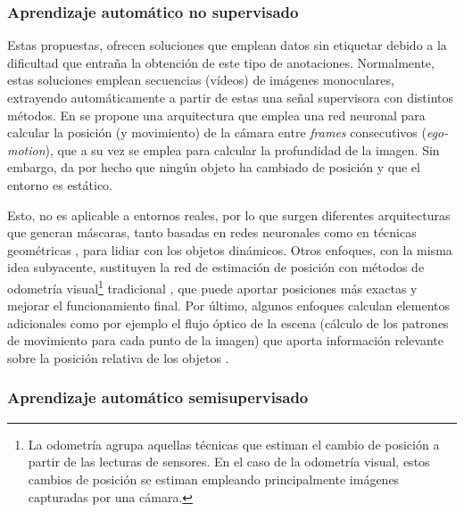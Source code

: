 
\subsubsection{Aprendizaje automático no supervisado}

Estas propuestas, ofrecen soluciones que emplean datos sin etiquetar debido a la dificultad que entraña la obtención de este tipo de anotaciones. Normalmente, estas soluciones emplean secuencias (vídeos) de imágenes monoculares, extrayendo automáticamente a partir de estas una señal supervisora con distintos métodos. En \cite{zhou2017unsupervised} se propone una arquitectura que emplea una red neuronal para calcular la posición (y movimiento) de la cámara entre \textit{frames} consecutivos (\textit{ego-motion}), que a su vez se emplea para calcular la profundidad de la imagen. Sin embargo, da por hecho que ningún objeto ha cambiado de posición y que el entorno es estático. 

Esto, no es aplicable a entornos reales, por lo que surgen diferentes arquitecturas que generan máscaras, tanto basadas en redes neuronales \cite{zhou2017unsupervised, vijayanarasimhan2017sfmnet} como en técnicas geométricas \cite{geo_mask_egomotion, monodepth}, para lidiar con los objetos dinámicos. Otros enfoques, con la misma idea subyacente, sustituyen la red de estimación de posición con métodos de odometría visual\footnote{La odometría agrupa aquellas técnicas que estiman el cambio de posición a partir de las lecturas de sensores. En el caso de la odometría visual, estos cambios de posición se estiman empleando principalmente imágenes capturadas por una cámara.} tradicional \cite{visualodometryunsupervised}, que puede aportar posiciones más exactas y mejorar el funcionamiento final. Por último, algunos enfoques calculan elementos adicionales como por ejemplo el flujo óptico de la escena (cálculo de los patrones de movimiento para cada punto de la imagen) que aporta información relevante sobre la posición relativa de los objetos \cite{vijayanarasimhan2017sfmnet, geonet}. 

\subsubsection{Aprendizaje automático semisupervisado}

